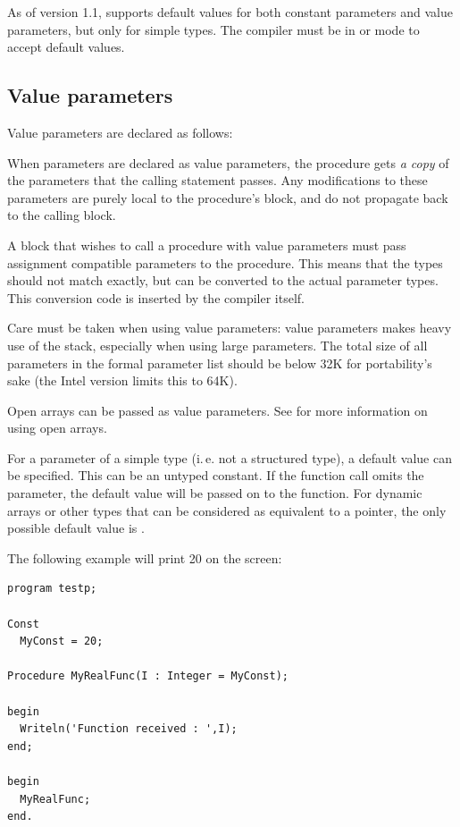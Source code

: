 As of version 1.1, \fpc supports default values for both constant parameters
and value parameters, but only for simple types. The compiler must be in
 or  mode to accept default values.

\subsection{Value parameters}
Value parameters are declared as follows:

When parameters are declared as value parameters, the procedure gets {\em
a copy} of the parameters that the calling statement passes. Any modifications
to these parameters are purely local to the procedure's block, and do not
propagate back to the calling block.

A block that wishes to call a procedure with value parameters must pass
assignment compatible parameters to the procedure.
This means that the types
should not match exactly, but can be converted to the actual parameter
types. This conversion code is inserted by the compiler itself.

Care must be taken when using value parameters: value parameters makes heavy
use of the stack, especially when using large parameters. The total size of
all parameters in the formal parameter list should be below 32K for
portability's sake (the Intel version limits this to 64K).

Open arrays can be passed as value parameters. See  for
more information on using open arrays.

For a parameter of a  simple type (i.\,e. not a structured type), a default
value can be specified. This can be an untyped constant. If the function
call omits the parameter, the default value will be passed on to the
function. For dynamic arrays or other types that can be considered as
equivalent to a pointer, the only possible default value is .

The following example will print 20 on the screen:
\begin{verbatim}
program testp;

Const
  MyConst = 20;

Procedure MyRealFunc(I : Integer = MyConst);

begin
  Writeln('Function received : ',I);
end;

begin
  MyRealFunc;
end.
\end{verbatim}

